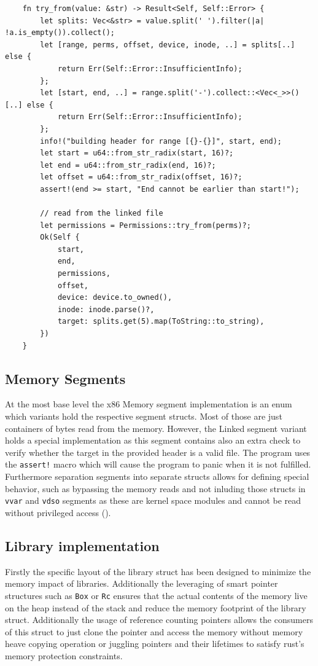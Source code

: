 \begin{lstlisting}
    fn try_from(value: &str) -> Result<Self, Self::Error> {
        let splits: Vec<&str> = value.split(' ').filter(|a| !a.is_empty()).collect();
        let [range, perms, offset, device, inode, ..] = splits[..] else {
            return Err(Self::Error::InsufficientInfo);
        };
        let [start, end, ..] = range.split('-').collect::<Vec<_>>()[..] else {
            return Err(Self::Error::InsufficientInfo);
        };
        info!("building header for range [{}-{}]", start, end);
        let start = u64::from_str_radix(start, 16)?;
        let end = u64::from_str_radix(end, 16)?;
        let offset = u64::from_str_radix(offset, 16)?;
        assert!(end >= start, "End cannot be earlier than start!");

        // read from the linked file
        let permissions = Permissions::try_from(perms)?;
        Ok(Self {
            start,
            end,
            permissions,
            offset,
            device: device.to_owned(),
            inode: inode.parse()?,
            target: splits.get(5).map(ToString::to_string),
        })
    }
\end{lstlisting}

\subsection{Memory Segments}

At the most base level the x86 Memory segment implementation is an enum which variants hold the respective segment structs. Most of those are just containers of bytes read from the memory.
However, the Linked segment variant holds a special implementation as this segment contains also an extra check to verify whether the target in the provided header is a valid file. 
The program uses the \verb|assert!| macro which will cause the program to panic when it is not fulfilled.
Furthermore separation segments into separate structs allows for defining special behavior, such as bypassing the memory reads and not inluding those structs in \verb|vvar| and \verb|vdso| segments as these are kernel space modules and cannot be read without privileged access (\cite{TODO}).

\subsection{Library implementation}

Firstly the specific layout of the library struct has been designed to minimize the memory impact of libraries.
Additionally the leveraging of smart pointer structures such as \verb|Box| or \verb|Rc| ensures that the actual contents of the memory live on the heap instead of the stack and reduce the memory footprint of the library struct.
Additionally the usage of reference counting pointers allows the consumers  of this struct to just clone the pointer and access the memory without memory heave copying operation or juggling pointers and their lifetimes to satisfy rust's memory protection constraints.


